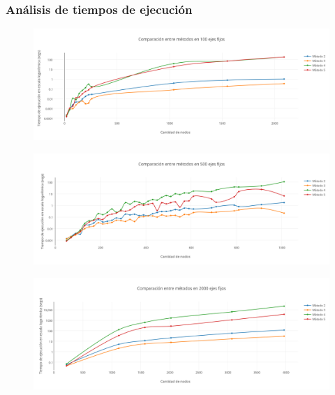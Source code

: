 \subsubsection{An\'alisis de tiempos de ejecuci\'on}


  \begin{figure}[h!]
   \begin{center}
 	\includegraphics[scale=0.17]{imagenes/local/tiempos/100ejes.png}
   \end{center}
 \end{figure}
 

  \begin{figure}[h!]
   \begin{center}
 	\includegraphics[scale=0.5]{imagenes/local/tiempos/500ejes.png}
   \end{center}
 \end{figure}
 
   \begin{figure}[h!]
   \begin{center}
 	\includegraphics[scale=0.5]{imagenes/local/tiempos/2000ejes.png}
   \end{center}
 \end{figure}
 
